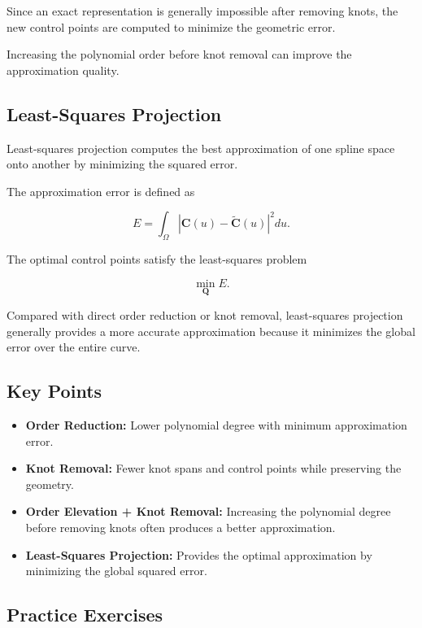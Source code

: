 \documentclass[dvipdfmx,11pt,a4paper,uplatex]{jsarticle}
\begin{document}
Since an exact representation is generally impossible after removing knots, the new control points are computed to minimize the geometric error.

Increasing the polynomial order before knot removal can improve the approximation quality.

\bigskip

\subsection{Least-Squares Projection}

Least-squares projection computes the best approximation of one spline space onto another by minimizing the squared error.

The approximation error is defined as

\[
E=
\int_{\Omega}
\left|
\mathbf{C}(u)-\tilde{\mathbf{C}}(u)
\right|^2du.
\]

The optimal control points satisfy the least-squares problem

\[
\min_{\mathbf{Q}} E.
\]

Compared with direct order reduction or knot removal, least-squares projection generally provides a more accurate approximation because it minimizes the global error over the entire curve.

\bigskip

\subsection{Key Points}

\begin{itemize}
\item \textbf{Order Reduction:} Lower polynomial degree with minimum approximation error.
\item \textbf{Knot Removal:} Fewer knot spans and control points while preserving the geometry.
\item \textbf{Order Elevation + Knot Removal:} Increasing the polynomial degree before removing knots often produces a better approximation.
\item \textbf{Least-Squares Projection:} Provides the optimal approximation by minimizing the global squared error.
\end{itemize}

\bigskip

\subsection{Practice Exercises}
\end{document}
